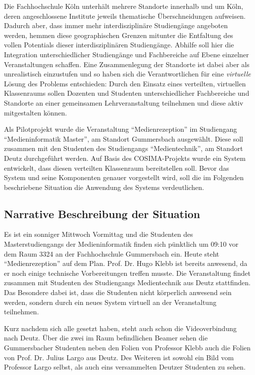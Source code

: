   Die Fachhochschule Köln unterhält mehrere Standorte innerhalb und um Köln, deren angeschlossene Institute jeweils thematische Überschneidungen aufweisen. Dadurch aber, dass immer mehr interdisziplinäre Studiengänge angeboten werden, hemmen diese geographischen Grenzen mitunter die Entfaltung des vollen Potentials dieser interdisziplinären Studiengänge. Abhilfe soll hier die Integration unterschiedlicher Studiengänge und Fachbereiche auf Ebene einzelner Veranstaltungen schaffen. Eine Zusammenlegung der Standorte ist dabei aber als unrealistisch einzustufen und so haben sich die Verantwortlichen für eine \emph{virtuelle} Lösung des Problems entschieden: Durch den Einsatz eines verteilten, virtuellen Klassenraums sollen Dozenten und Studenten unterschiedlicher Fachbereiche und Standorte an einer gemeinsamen Lehrveranstaltung teilnehmen und diese aktiv mitgestalten können.

  Als Pilotprojekt wurde die Veranstaltung "`Medienrezeption"' im Studiengang "`Medieninformatik Master"', am Standort Gummersbach ausgewählt. Diese soll zusammen mit den Studenten des Studiengangs "`Medientechnik"', am Standort Deutz durchgeführt werden. Auf Basis des COSIMA-Projekts wurde ein System entwickelt, dass diesen verteilten Klassenraum bereitstellen soll. Bevor das System und seine Komponenten genauer vorgestellt wird, soll die im Folgenden beschriebene Situation die Anwendung des Systems verdeutlichen.
  

\subsection{Narrative Beschreibung der Situation} %
\label{sub:ablaufbeschreibung}

  Es ist ein sonniger Mittwoch Vormittag und die Studenten des Masterstudiengangs der Medieninformatik finden sich pünktlich um 09:10 vor dem Raum 3324 an der Fachhochschule Gummersbach ein. Heute steht "`Medienrezeption"' auf dem Plan. Prof. Dr. Hugo Klebb ist bereits anwesend, da er noch einige technische Vorbereitungen treffen musste. Die Veranstaltung  findet zusammen mit Studenten des Studiengangs Medientechnik aus Deutz stattfinden. Das Besondere dabei ist, dass die Studenten nicht körperlich anwesend sein werden, sondern durch ein neues System virtuell an der Veranstaltung teilnehmen.

  Kurz nachdem sich alle gesetzt haben, steht auch schon die Videoverbindung nach Deutz. Über die zwei im Raum befindlichen Beamer sehen die Gummersbacher Studenten neben den Folien von Professor Klebb auch die Folien von Prof. Dr. Julius Largo aus Deutz. Des Weiteren ist sowohl ein Bild vom Professor Largo selbst, als auch eins versammelten Deutzer Studenten zu sehen.
  
